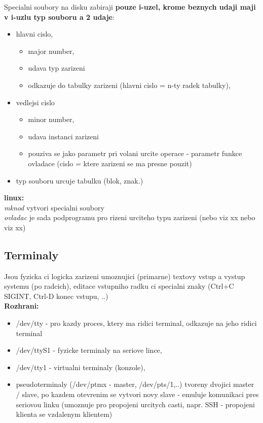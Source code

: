 \documentclass[a4paper, 11pt]{article}
\begin{document}
Specialni soubory na disku zabiraji \textbf{pouze i-uzel, krome beznych udaji maji v i-uzlu typ souboru a 2 udaje}:
\begin{itemize}
    \item hlavni cislo,
    \begin{itemize}
        \item major number,
        \item udava typ zarizeni
        \item odkazuje do tabulky zarizeni (hlavni cislo = n-ty radek tabulky),
    \end{itemize}
    \item vedlejsi cislo 
    \begin{itemize}
        \item minor number, 
        \item udava instanci zarizeni
        \item pouziva se jako parametr pri volani urcite operace - parametr funkce ovladace (cislo = ktere zarizeni se ma presne pouzit)
    \end{itemize}
    \item typ souboru urcuje tabulku (blok, znak.) \\
\end{itemize}

\textbf{linux:} \\[0.5em]
\textit{mknod} vytvori specialni soubory \\[0.2em]
\textit{ovladac} je sada podprogramu pro rizeni urciteho typu zarizeni (nebo viz xx nebo viz xx) \\

\newpage

\subsection{Terminaly}
Jsou fyzicka ci logicka zarizeni umoznujici (primarne) textovy vstup a vystup systemu (po radcich), editace vstupniho radku ci specialni znaky (Ctrl+C SIGINT, Ctrl-D konec vstupu, ..) \\

\textbf{Rozhrani:}
\begin{itemize}
    \item /dev/tty - pro kazdy proces, ktery ma ridici terminal, odkazuje na jeho ridici terminal
    \item /dev/ttyS1 - fyzicke terminaly na seriove lince,
    \item /dev/tty1 - virtualni terminaly (konzole),
    \item pseudoterminaly (/dev/ptmx - master, /dev/pts/1,..) tvoreny dvojici master / slave, po kazdem otevrenim se vytvori novy slave - emuluje komunikaci pres seriovou linku (umoznuje pro propojeni urcitych casti, napr. SSH - propojeni klienta se vzdalenym klientem) \\
\end{itemize}
\end{document}
